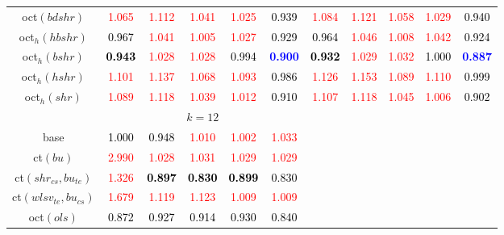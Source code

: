 \begin{tabular}[t]{c|>{}cccc>{}c|ccccc}
oct$(bdshr)$ & \textcolor{red}{1.065} & \textcolor{red}{1.112} & \textcolor{red}{1.041} & \textcolor{red}{1.025} & \textcolor{black}{0.939} & \textcolor{red}{1.084} & \textcolor{red}{1.121} & \textcolor{red}{1.058} & \textcolor{red}{1.029} & \textcolor{black}{0.940}\\
oct$_h(hbshr)$ & \textcolor{black}{0.967} & \textcolor{red}{1.041} & \textcolor{red}{1.005} & \textcolor{red}{1.027} & \textcolor{black}{0.929} & \textcolor{black}{0.964} & \textcolor{red}{1.046} & \textcolor{red}{1.008} & \textcolor{red}{1.042} & \textcolor{black}{0.924}\\
oct$_h(bshr)$ & \textcolor{black}{\textbf{0.943}} & \textcolor{red}{1.028} & \textcolor{red}{1.028} & \textcolor{black}{0.994} & \textcolor{blue}{\textbf{0.900}} & \textcolor{black}{\textbf{0.932}} & \textcolor{red}{1.029} & \textcolor{red}{1.032} & \textcolor{black}{1.000} & \textcolor{blue}{\textbf{0.887}}\\
oct$_h(hshr)$ & \textcolor{red}{1.101} & \textcolor{red}{1.137} & \textcolor{red}{1.068} & \textcolor{red}{1.093} & \textcolor{black}{0.986} & \textcolor{red}{1.126} & \textcolor{red}{1.153} & \textcolor{red}{1.089} & \textcolor{red}{1.110} & \textcolor{black}{0.999}\\
oct$_h(shr)$ & \textcolor{red}{1.089} & \textcolor{red}{1.118} & \textcolor{red}{1.039} & \textcolor{red}{1.012} & \textcolor{black}{0.910} & \textcolor{red}{1.107} & \textcolor{red}{1.118} & \textcolor{red}{1.045} & \textcolor{red}{1.006} & \textcolor{black}{0.902}\\
\addlinespace[0.3em]
\multicolumn{1}{c}{} & \multicolumn{5}{c}{\textbf{$k = 12$}} & \multicolumn{5}{c}{}\\
base & \textcolor{black}{1.000} & \textcolor{black}{0.948} & \textcolor{red}{1.010} & \textcolor{red}{1.002} & \textcolor{red}{1.033} &  &  &  &  & \\
ct$(bu)$ & \textcolor{red}{2.990} & \textcolor{red}{1.028} & \textcolor{red}{1.031} & \textcolor{red}{1.029} & \textcolor{red}{1.029} &  &  &  &  & \\
ct$(shr_{cs}, bu_{te})$ & \textcolor{red}{1.326} & \textcolor{black}{\textbf{0.897}} & \textcolor{black}{\textbf{0.830}} & \textcolor{black}{\textbf{0.899}} & \textcolor{black}{0.830} &  &  &  &  & \\
ct$(wlsv_{te}, bu_{cs})$ & \textcolor{red}{1.679} & \textcolor{red}{1.119} & \textcolor{red}{1.123} & \textcolor{red}{1.009} & \textcolor{red}{1.009} &  &  &  &  & \\
oct$(ols)$ & \textcolor{black}{0.872} & \textcolor{black}{0.927} & \textcolor{black}{0.914} & \textcolor{black}{0.930} & \textcolor{black}{0.840} &  &  &  &  & \\

\end{tabular}
